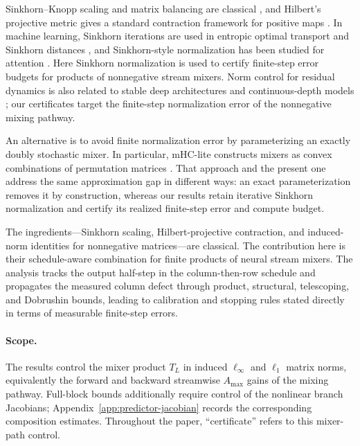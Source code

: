 \documentclass[10pt]{article}
\numberwithin{equation}{section}
\theoremstyle{plain}
\theoremstyle{definition}
\theoremstyle{remark}
\newcommand{\Amax}{\texorpdfstring{\ensuremath{A_{\max}}}{Amax}\xspace}
\begin{document}
Sinkhorn--Knopp scaling and matrix balancing are classical
\citep{SinkhornKnopp1967,FranklinLorenz1989,Knight2008}, and Hilbert's
projective metric gives a standard contraction framework for positive maps
\citep{Birkhoff1957,Bushell1973}.  In machine learning, Sinkhorn iterations are
used in entropic optimal transport and Sinkhorn distances
\citep{Cuturi2013,PeyreCuturi2019}, and Sinkhorn-style normalization has been
studied for attention \citep{Sander2022Sinkformers,Shahbazi2025ESPFormer}.  Here
Sinkhorn normalization is used to certify finite-step error budgets for products of
nonnegative stream mixers.
Norm control for residual dynamics is also related to stable deep architectures
and continuous-depth models \citep{HaberRuthotto2018,Chen2018NeuralODE}; our
certificates target the finite-step normalization error of the nonnegative mixing
pathway.

An alternative is to avoid finite normalization error by parameterizing an
exactly doubly stochastic mixer.  In particular, mHC-lite constructs mixers as
convex combinations of permutation matrices \citep{YangGao2026mHCLite}.  That
approach and the present one address the same approximation gap in different
ways: an exact parameterization removes it by construction, whereas our results
retain iterative Sinkhorn normalization and certify its realized finite-step
error and compute budget.

The ingredients---Sinkhorn scaling, Hilbert-projective contraction, and induced-norm
identities for nonnegative matrices---are classical. The contribution here is their
schedule-aware combination for finite products of neural stream mixers. The analysis
tracks the output half-step in the column-then-row schedule and propagates the measured
column defect through product, structural, telescoping, and Dobrushin bounds, leading to
calibration and stopping rules stated directly in terms of measurable finite-step errors.

\paragraph{Scope.}
The results control the mixer product \(T_L\) in induced \(\ell_\infty\) and
\(\ell_1\) matrix norms, equivalently the forward and backward streamwise
\Amax gains of the mixing pathway. Full-block bounds additionally require
control of the nonlinear branch Jacobians; Appendix~\ref{app:predictor-jacobian}
records the corresponding composition estimates. Throughout the paper,
``certificate'' refers to this mixer-path control.
\end{document}
